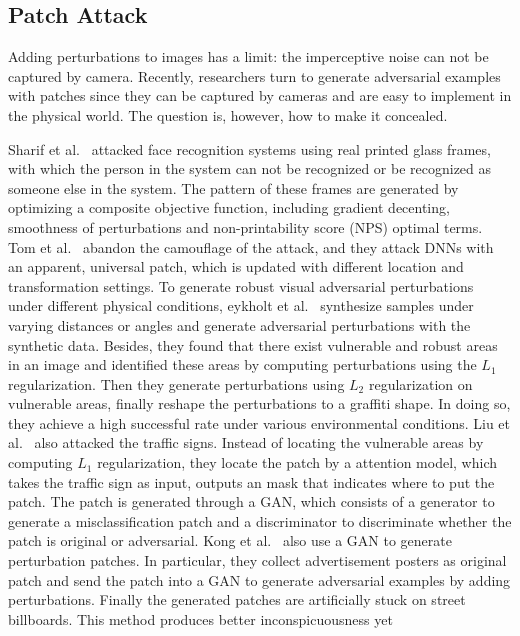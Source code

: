 \documentclass[10pt,twocolumn,letterpaper]{article}
\begin{document}
\subsection{Patch Attack}
Adding perturbations to images has a limit: 
the imperceptive noise can not be captured by camera.
Recently, researchers turn to generate adversarial examples with
patches since they can be captured by cameras and are easy to implement 
in the physical world. The question is, however, how to make it concealed.

Sharif et al.~\cite{Sharif_2017_CCS} attacked face recognition systems
using real printed glass frames, 
with which the person in the system can not be recognized or be recognized 
as someone else in the system. The pattern of these frames are 
generated by optimizing a composite objective function, 
including gradient decenting, smoothness of perturbations and 
non-printability score (NPS) optimal terms.
Tom et al.~\cite{Brown_2017_arxiv} abandon the camouflage of the attack, 
and they attack DNNs with an apparent, universal patch, 
which is updated with different location and transformation settings.
To generate robust visual adversarial perturbations under different 
physical conditions, 
eykholt et al.~\cite{Eykholt_2018_CVPR} synthesize samples under
varying distances or angles and generate adversarial perturbations
with the synthetic data.
Besides, they found that there exist vulnerable and robust areas in an 
image and identified these areas by computing perturbations 
using the $L_1$ regularization. Then they generate perturbations 
using $L_2$ regularization on vulnerable areas, finally reshape 
the perturbations to a graffiti shape. In doing so, they achieve 
a high successful rate under various environmental conditions.
Liu et al.~\cite{Liu_2019_AAAI} also attacked the traffic signs. 
Instead of 
locating the vulnerable areas by computing $L_1$ regularization, 
they locate the patch by a attention model, which takes the 
traffic sign as input, outputs an mask that indicates where 
to put the patch. 
The patch is generated through a GAN, which consists of a generator 
to generate a misclassification patch and a discriminator 
to discriminate whether the patch is original or adversarial. 
Kong et al.~\cite{Kong_2020_CVPR} also use a GAN to generate 
perturbation patches. 
In particular, they collect advertisement posters as original patch
and send the patch into a GAN to generate adversarial examples by 
adding perturbations. Finally the generated patches are
artificially stuck on street billboards. 
This method produces better inconspicuousness yet 
\end{document}
